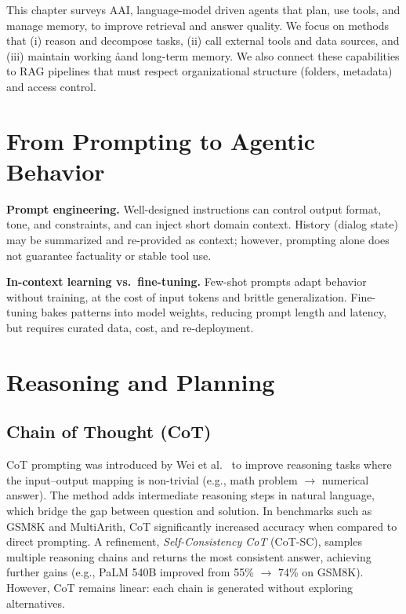 \label{chap:sota-agentic-ai}
\cleardoublepage

This chapter surveys \ac{AAI}, language-model driven agents that plan, use tools, and manage memory, to improve retrieval and answer quality. We focus on methods that (i) reason and decompose tasks, (ii) call external tools and data sources, and (iii) maintain working åand long-term memory. We also connect these capabilities to \ac{RAG} pipelines that must respect organizational structure (folders, metadata) and access control.

\section{From Prompting to Agentic Behavior}
\textbf{Prompt engineering.} Well-designed instructions can control output format, tone, and constraints, and can inject short domain context. History (dialog state) may be summarized and re-provided as context; however, prompting alone does not guarantee factuality or stable tool use.

\textbf{In-context learning vs.\ fine-tuning.} Few-shot prompts adapt behavior without training, at the cost of input tokens and brittle generalization. Fine-tuning bakes patterns into model weights, reducing prompt length and latency, but requires curated data, cost, and re-deployment.

\section{Reasoning and Planning}
\subsection{Chain of Thought (CoT)}
CoT prompting was introduced by Wei et al.~\cite{chainofthought} to improve reasoning tasks where the input–output mapping is non-trivial (e.g., math problem $\to$ numerical answer). The method adds intermediate reasoning steps in natural language, which bridge the gap between question and solution.
In benchmarks such as GSM8K and MultiArith, CoT significantly increased accuracy when compared to direct prompting. A refinement, \emph{Self-Consistency CoT} (CoT-SC), samples multiple reasoning chains and returns the most consistent answer, achieving further gains (e.g., PaLM 540B improved from 55\% $\to$ 74\% on GSM8K). However, CoT remains linear: each chain is generated without exploring alternatives.

